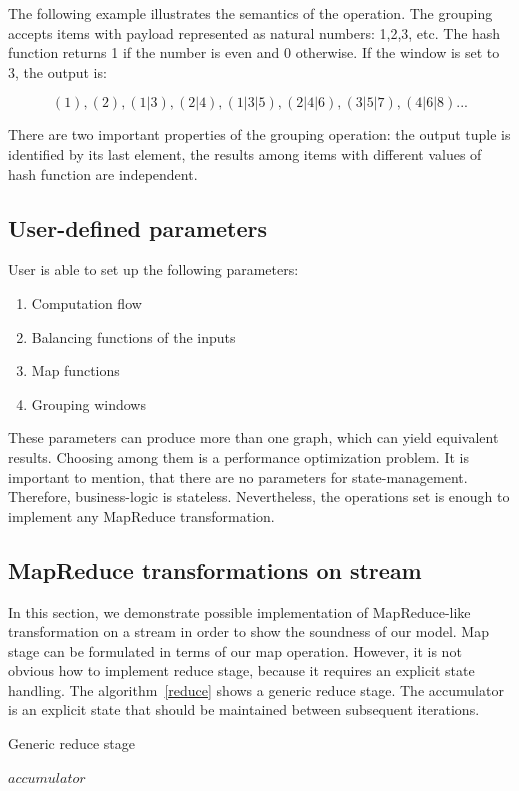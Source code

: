 The following example illustrates the semantics of the operation. The grouping accepts items with payload represented as natural numbers: 1,2,3, etc. The hash function returns 1 if the number is even and 0 otherwise. If the window is set to 3, the output is:

\[(1), (2), (1|3), (2|4), (1|3|5), (2|4|6), (3|5|7), (4|6|8)...\]

There are two important properties of the grouping operation: the output tuple is identified by its last element, the results among items with different values of hash function are independent.

\subsection{User-defined parameters}

User is able to set up the following parameters:

\begin{enumerate}
  \item{Computation flow}
  \item{Balancing functions of the inputs}
  \item{Map functions}
  \item{Grouping windows}
\end{enumerate}

These parameters can produce more than one graph, which can yield equivalent results. Choosing among them is a performance optimization problem.    
It is important to mention, that there are no parameters for state-management. Therefore, business-logic is stateless. Nevertheless, the operations set is enough to implement any MapReduce transformation.

\subsection{MapReduce transformations on stream}

In this section, we demonstrate possible implementation of MapReduce-like transformation on a stream in order to show the soundness of our model. Map stage can be formulated in terms of our map operation. However, it is not obvious how to implement reduce stage, because it requires an explicit state handling. The algorithm~\ref{reduce} shows a generic reduce stage. The accumulator is an explicit state that should be maintained between subsequent iterations.

\begin{algorithm}
\caption{Generic reduce stage}
\label{reduce}
\begin{algorithmic}
    \State $accumulator$ 
      \State {}
    \EndFor
    \State \Return {}
  \EndFunction
\end{algorithmic}
\end{algorithm}

